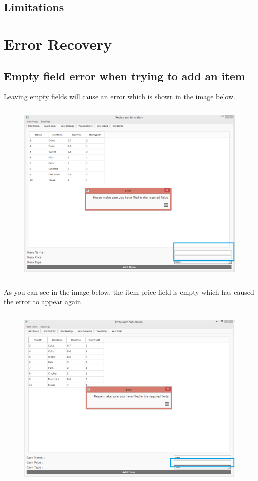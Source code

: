 \subsection{Limitations}

\section{Error Recovery}

\subsection{Empty field error when trying to add an item}

Leaving empty fields will cause an error which is shown in the image below. \\


\begin{figure}[H]
    \includegraphics[height = 9cm]{./Manual/images/HamError1} 
    \caption{} \label{fig:hamerror1}
\end{figure}

As you can see in the image below, the item price field is empty which has caused the error to appear again.

\begin{figure}[H]
    \includegraphics[height = 9cm]{./Manual/images/HamError2} 
    \caption{} \label{fig:hamerror2}
\end{figure}

